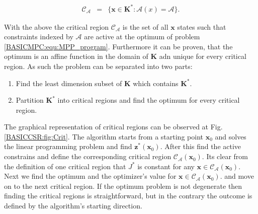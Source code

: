     \begin{equation}
    \begin{array}{rcl}
            \mathcal{C}_{\mathcal{A}}&=&\{\textbf{x}\in\textbf{K}^*:\mathcal{A}(x)=\mathcal{A}\}.
        \end{array}
        \label{BASICMPC:equ:MPP_stateset_optimal critical}
    \end{equation}

    With the above the critical region $\mathcal{C}_{\mathcal{A}}$ is the set of all $\textbf{x}$ states such that constraints indexed by $\mathcal{A}$ are active at the optimum of problem \ref{BASICMPC:equ:MPP_program}. Furthermore it can be proven, that the optimum is an affine function in the domain of $\textbf{K}$ adn unique for every critical region. As such the problem can be separated into two parts:

    \begin{enumerate}
    \item Find the least dimension subset of $\textbf{K}$ which contains $\textbf{K}^*$.
    \item Partition $\textbf{K}^*$ into critical regions and find the optimum for every critical region.
    \end{enumerate}

    The graphical representation of critical regions can be observed at Fig.\ref{BASICCSR:fig:Crit}. The algorithm starts from a starting point $\textbf{x}_0$ and solves the linear programming problem and find $\textbf{z}^*(\textbf{x}_0)$. After this find the active constrains and define the corresponding critical region $\mathcal{C}_{\mathcal{A}}(\textbf{x}_0)$. Its clear from the definition of one critical region that $J^*$ is constant for any $\textbf{x}\in\mathcal{C}_{\mathcal{A}}(\textbf{x}_0)$. Next  we find the optimum and the optimizer's value for $\textbf{x}\in\mathcal{C}_{\mathcal{A}}(\textbf{x}_0)$. and move on to the next critical region. If the optimum problem is not degenerate then finding the critical regions is straightforward, but in the contrary the outcome is defined by the algorithm's starting direction.

